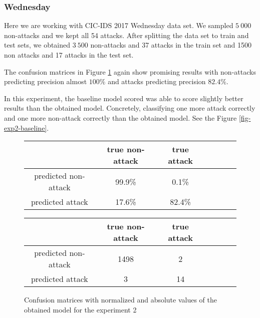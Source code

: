 \documentclass{article}
\begin{document}
\clearpage



\subsubsection{Wednesday}
Here we are working with CIC-IDS 2017 Wednesday data set. We sampled $5\ 000$ non-attacks and we kept all 54 attacks. After splitting the data set to train and test sets, we obtained $3\ 500$ non-attacks and 37 attacks in the train set and 1500 non attacks and 17 attacks in the test set.

The confusion matrices in Figure \ref{fig-exp2-transcriptions} again show promising results with non-attacks predicting precision almost $100\%$ and attacks predicting precision $82.4\%$.

In this experiment, the baseline model scored was able to score slightly better results than the obtained model. Concretely, classifying one more attack correctly and one more non-attack correctly than the obtained model. See the Figure \ref{fig-exp2-baseline}.

\begin{figure}[h!]
    \centering
    \begin{tabular}{ |c|c|c|c|c|c|c| }
     \hline
      & true non-attack & true attack \\
     \hline
     predicted non-attack & 99.9\% & 0.1\% \\
     \hline
     predicted attack & 17.6\% & 82.4\% \\
     \hline
    \end{tabular}

    \vspace{0.2cm}

    \centering
    \begin{tabular}{ |c|c|c|c|c|c|c| }
     \hline
      & true non-attack & true attack \\
     \hline
     predicted non-attack & 1498 & 2 \\
     \hline
     predicted attack & 3 & 14 \\
     \hline
    \end{tabular}
    \caption{Confusion matrices with normalized and absolute values of the obtained model for the experiment 2}
    \label{fig-exp2-transcriptions}
\end{figure}
\end{document}
